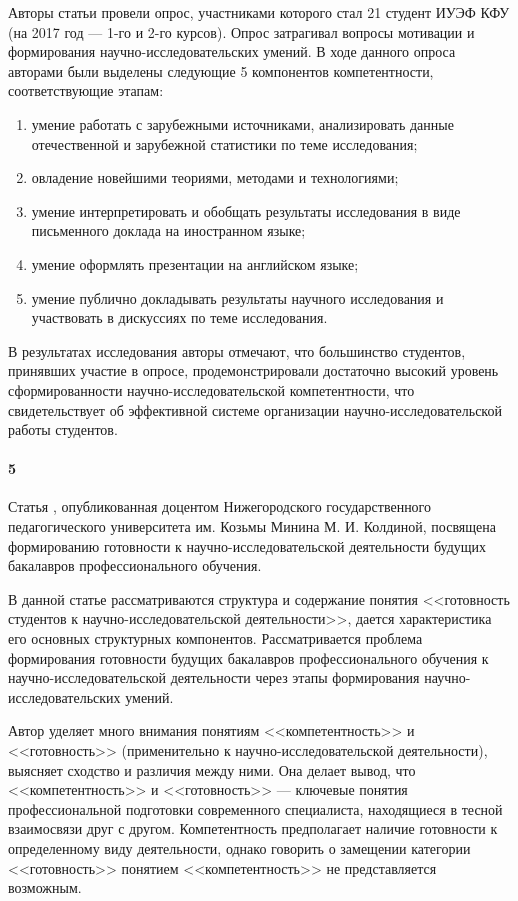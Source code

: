 \documentclass[oneside]{scrartcl}
\begin{document}
Авторы статьи провели опрос, участниками которого стал 21 студент ИУЭФ КФУ (на 2017 год --- 1-го и 2-го курсов).
Опрос затрагивал вопросы мотивации и формирования научно-исследовательских умений. В ходе данного опроса авторами были 
выделены следующие 5 компонентов компетентности, соответствующие этапам:
\begin{enumerate}[1)]
\item умение работать с зарубежными источниками, анализировать данные отечественной и зарубежной статистики
 по теме исследования;
\item овладение новейшими теориями, методами и технологиями;
\item умение интерпретировать и обобщать результаты исследования в виде письменного доклада на иностранном языке; 
\item умение оформлять презентации на английском языке; 
\item умение публично докладывать результаты научного исследования и участвовать в дискуссиях по теме исследования.
\end{enumerate}

В результатах исследования авторы отмечают, что большинство студентов, принявших участие в опросе, продемонстрировали достаточно
высокий уровень сформированности научно-исследовательской компетентности, что свидетельствует об эффективной системе
организации научно-исследовательской работы студентов.

\paragraph{5}
Статья \cite{koldina}, опубликованная доцентом Нижегородского государственного педагогического университета им. Козьмы Минина
М. И. Колдиной, посвящена формированию готовности к научно-исследовательской деятельности будущих бакалавров профессионального
обучения.

В данной статье рассматриваются структура и содержание понятия <<готовность студентов к научно-исследовательской деятельности>>,
дается характеристика его основных структурных компонентов. Рассматривается проблема формирования готовности будущих бакалавров
профессионального обучения к научно-исследовательской деятельности через этапы формирования научно-исследовательских умений.

Автор уделяет много внимания понятиям <<компетентность>> и <<готовность>> (применительно к научно-исследовательской деятельности),
выясняет сходство и различия между ними. Она делает вывод, что <<компетентность>> и <<готовность>> --- ключевые понятия
профессиональной подготовки современного специалиста, находящиеся в тесной взаимосвязи друг с другом. 
Компетентность предполагает наличие готовности к определенному виду деятельности, однако говорить о замещении
категории <<готовность>> понятием <<компетентность>> не представляется возможным.
\end{document}
